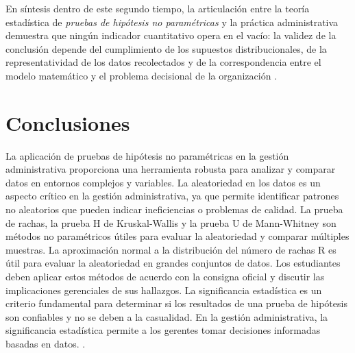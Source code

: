 {En síntesis dentro de este segundo tiempo, la articulación entre la teoría estadística de \textit{pruebas de hipótesis no paramétricas} y la práctica administrativa demuestra que ningún indicador cuantitativo opera en el vacío: la validez de la conclusión depende del cumplimiento de los supuestos distribucionales, de la representatividad de los datos recolectados y de la correspondencia entre el modelo matemático y el problema decisional de la organización \citep{anderson2012,nistHandbook,guarin2002}.

\clearpage
\section{Conclusiones}
La aplicación de pruebas de hipótesis no paramétricas en la gestión administrativa proporciona una herramienta robusta para analizar y comparar datos en entornos complejos y variables. La aleatoriedad en los datos es un aspecto crítico en la gestión administrativa, ya que permite identificar patrones no aleatorios que pueden indicar ineficiencias o problemas de calidad. La prueba de rachas, la prueba H de Kruskal-Wallis y la prueba U de Mann-Whitney son métodos no paramétricos útiles para evaluar la aleatoriedad y comparar múltiples muestras. La aproximación normal a la distribución del número de rachas R es útil para evaluar la aleatoriedad en grandes conjuntos de datos. Los estudiantes deben aplicar estos métodos de acuerdo con la consigna oficial y discutir las implicaciones gerenciales de sus hallazgos. La significancia estadística es un criterio fundamental para determinar si los resultados de una prueba de hipótesis son confiables y no se deben a la casualidad. En la gestión administrativa, la significancia estadística permite a los gerentes tomar decisiones informadas basadas en datos. \citep{anderson2012,lind2012,wackerly2010,diazRodriguez2022}.
}

